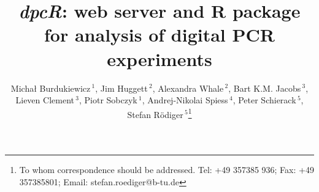 \documentclass[a4,center,fleqn]{NAR}
\begin{document}
\title{\textit{dpcR}: web server and R package for analysis of digital PCR 
experiments}

\author{%
Micha\l{} Burdukiewicz\,$^{1}$,
Jim Huggett\,$^{2}$,
Alexandra Whale\,$^{2}$,
Bart K.M. Jacobs\,$^{3}$,
Lieven Clement\,$^{3}$,
Piotr Sobczyk\,$^{1}$,
Andrej-Nikolai Spiess\,$^{4}$,
Peter Schierack\,$^{5}$,
Stefan R\"odiger\,$^{5}$\footnote{To whom correspondence should be addressed.
Tel: +49 357385 936; Fax: +49 357385801; Email: stefan.roediger@b-tu.de}}

\address{%
$^{1}$Department of Genomics, Faculty of Biotechnology, University of 
Wroc\l{}aw, Wroc\l{}aw, Poland
and
$^{2}$Molecular and Cell Biology Team, LGC, Teddington, United Kingdom
and
$^{3}$Department of Applied Mathematics, Computer Science and Statistics, Ghent 
University, Belgium
and
$^{4}$University Medical Center Hamburg-Eppendorf, Hamburg, Germany
and
$^{5}$Institute of Biotechnology, Brandenburg University of Technology 
Cottbus~--~Senftenberg, Gro\ss{}enhainer Str. 57, 01968, Senftenberg, Germany
}


\maketitle
\end{document}
